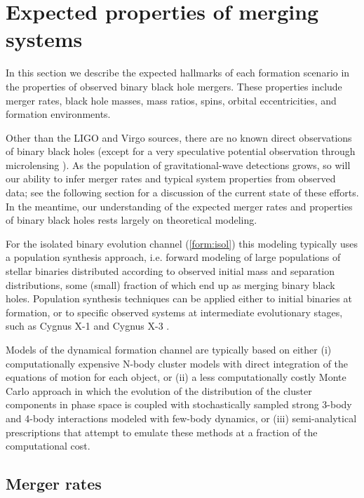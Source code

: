 \documentclass[iop,onecolumn]{revtex4-1}
\begin{document}
\section{Expected properties of merging systems}\label{merge}

In this section we describe the expected hallmarks of each formation scenario in the properties of observed binary black hole mergers. These properties include merger rates, black hole masses, mass ratios, spins, orbital eccentricities, and formation environments.

Other than the LIGO and Virgo sources, there are no known direct observations of binary black holes (except for a very speculative potential observation through microlensing \citep{Dong:2007}). As the population of gravitational-wave detections grows, so will our ability to infer merger rates and typical system properties from observed data; see the following section for a discussion of the current state of these efforts. In the meantime, our understanding of the expected merger rates and properties of binary black holes rests largely on theoretical modeling. 

For the isolated binary evolution channel (\autoref{form:isol}) this modeling typically uses a population synthesis approach, i.e. forward modeling of large populations of stellar binaries distributed according to observed initial mass and separation distributions, some (small) fraction of which end up as merging binary black holes. Population synthesis techniques can be applied either to initial binaries at formation, or to specific observed systems at intermediate evolutionary stages, such as Cygnus X-1 \citep{Bulik:2008} and Cygnus X-3 \citep{CygnusX3:2012}.  

Models of the dynamical formation channel are typically based on either (i) computationally expensive N-body cluster models with direct integration of the equations of motion for each object, or (ii) a less computationally costly Monte Carlo approach in which the evolution of the distribution of the cluster components in phase space is coupled with stochastically sampled strong 3-body and 4-body interactions modeled with few-body dynamics, or (iii) semi-analytical prescriptions that attempt to emulate these methods at a fraction of the computational cost. 

\subsection{Merger rates}
\end{document}
